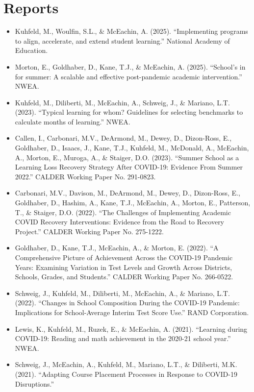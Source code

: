 \documentclass[11pt, letterpaper]{article}
\begin{document}
\section{Reports}
\begin{itemize}
  \item Kuhfeld, M., Woulfin, S.L., \& McEachin, A. (2025).
  ``Implementing programs to align, accelerate, and extend student learning.''
National Academy of Education. 
  \item Morton, E., Goldhaber, D., Kane, T.J., \& McEachin, A. (2025).
  ``School's in for summer: A scalable and effective post-pandemic academic intervention.''
NWEA. 
  \item Kuhfeld, M., Diliberti, M., McEachin, A., Schweig, J., \& Mariano, L.T. (2023).
  ``Typical learning for whom? Guidelines for selecting benchmarks to calculate months of learning.''
NWEA. 
  \item Callen, I., Carbonari, M.V., DeArmond, M., Dewey, D., Dizon-Ross, E., Goldhaber, D., Isaacs, J., Kane, T.J., Kuhfeld, M., McDonald, A., McEachin, A., Morton, E., Muroga, A., \& Staiger, D.O. (2023).
  ``Summer School as a Learning Loss Recovery Strategy After COVID-19: Evidence From Summer 2022.''
CALDER Working Paper No. 291-0823. 
  \item Carbonari, M.V., Davison, M., DeArmond, M., Dewey, D., Dizon-Ross, E., Goldhaber, D., Hashim, A., Kane, T.J., McEachin, A., Morton, E., Patterson, T., \& Staiger, D.O. (2022).
  ``The Challenges of Implementing Academic COVID Recovery Interventions: Evidence from the Road to Recovery Project.''
CALDER Working Paper No. 275-1222. 
  \item Goldhaber, D., Kane, T.J., McEachin, A., \& Morton, E. (2022).
  ``A Comprehensive Picture of Achievement Across the COVID-19 Pandemic Years: Examining Variation in Test Levels and Growth Across Districts, Schools, Grades, and Students.''
CALDER Working Paper No. 266-0522. 
  \item Schweig, J., Kuhfeld, M., Diliberti, M., McEachin, A., \& Mariano, L.T. (2022).
  ``Changes in School Composition During the COVID-19 Pandemic: Implications for School-Average Interim Test Score Use.''
RAND Corporation. 
  \item Lewis, K., Kuhfeld, M., Ruzek, E., \& McEachin, A. (2021).
  ``Learning during COVID-19: Reading and math achievement in the 2020-21 school year.''
NWEA. 
  \item Schweig, J., McEachin, A., Kuhfeld, M., Mariano, L.T., \& Diliberti, M.K. (2021).
  ``Adapting Course Placement Processes in Response to COVID-19 Disruptions.''

\end{itemize}
\end{document}
